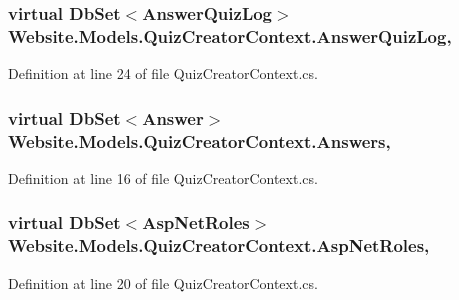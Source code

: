\subsubsection[{Answer\+Quiz\+Log}]{\setlength{\rightskip}{0pt plus 5cm}virtual Db\+Set$<${\bf Answer\+Quiz\+Log}$>$ Website.\+Models.\+Quiz\+Creator\+Context.\+Answer\+Quiz\+Log\hspace{0.3cm}{\ttfamily [get]}, {\ttfamily [set]}}\label{class_website_1_1_models_1_1_quiz_creator_context_ae072164f7a9c836c35e6a2315f3cad36}


Definition at line 24 of file Quiz\+Creator\+Context.\+cs.

\hypertarget{class_website_1_1_models_1_1_quiz_creator_context_afc95ea074c2a4451ecef26082e4ff4de}{}
\subsubsection[{Answers}]{\setlength{\rightskip}{0pt plus 5cm}virtual Db\+Set$<${\bf Answer}$>$ Website.\+Models.\+Quiz\+Creator\+Context.\+Answers\hspace{0.3cm}{\ttfamily [get]}, {\ttfamily [set]}}\label{class_website_1_1_models_1_1_quiz_creator_context_afc95ea074c2a4451ecef26082e4ff4de}


Definition at line 16 of file Quiz\+Creator\+Context.\+cs.

\hypertarget{class_website_1_1_models_1_1_quiz_creator_context_ac37c54c66f303a8f0b4e6b58df6910ac}{}
\subsubsection[{Asp\+Net\+Roles}]{\setlength{\rightskip}{0pt plus 5cm}virtual Db\+Set$<${\bf Asp\+Net\+Roles}$>$ Website.\+Models.\+Quiz\+Creator\+Context.\+Asp\+Net\+Roles\hspace{0.3cm}{\ttfamily [get]}, {\ttfamily [set]}}\label{class_website_1_1_models_1_1_quiz_creator_context_ac37c54c66f303a8f0b4e6b58df6910ac}


Definition at line 20 of file Quiz\+Creator\+Context.\+cs.

